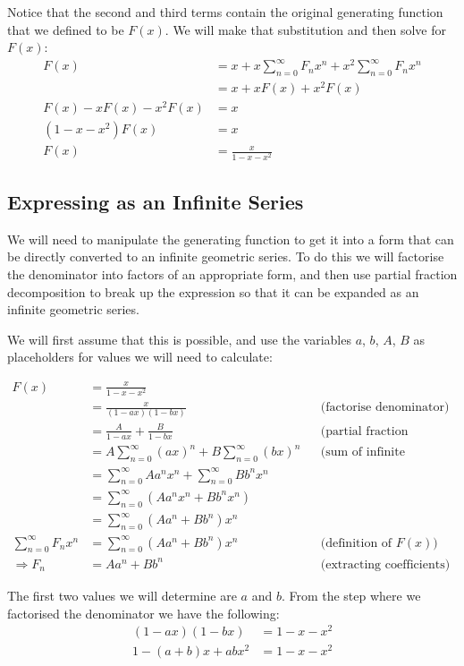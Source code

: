 \documentclass{article}
\begin{document}
Notice that the second and third terms contain the original generating function
that we defined to be \(F(x)\). We will make that substitution and then solve
for \(F(x)\):
\[\begin{aligned}
    F(x) &= x + x\sum_{n=0}^\infty F_nx^n + x^2\sum_{n=0}^\infty F_nx^n \\
    &= x + xF(x) + x^2F(x) \\
    F(x) - xF(x) - x^2F(x) &= x \\
    (1 - x - x^2)F(x) &= x \\
    F(x) &= \frac{x}{1-x-x^2}
\end{aligned}\]

\subsection*{Expressing as an Infinite Series}
We will need to manipulate the generating function to get it into a form that
can be directly converted to an infinite geometric series. To do this we will
factorise the denominator into factors of an appropriate form, and then use
partial fraction decomposition to break up the expression so that it can be
expanded as an infinite geometric series.

We will first assume that this is possible, and use the variables \(a\), \(b\),
\(A\), \(B\) as placeholders for values we will need to calculate:

\[\begin{aligned}
    F(x) &= \frac{x}{1-x-x^2} \\
    &= \frac{x}{(1-ax)(1-bx)} && \text{(factorise denominator)} \\
    &= \frac{A}{1-ax} + \frac{B}{1-bx}
        && \text{(partial fraction decomposition)} \\
    &= A \sum_{n=0}^\infty(ax)^n + B \sum_{n=0}^\infty(bx)^n
        && \text{(sum of infinite geometric series)} \\
    &= \sum_{n=0}^\infty Aa^nx^n + \sum_{n=0}^\infty Bb^nx^n \\
    &= \sum_{n=0}^\infty(Aa^nx^n + Bb^nx^n) \\
    &= \sum_{n=0}^\infty(Aa^n + Bb^n)x^n \\
    \sum_{n=0}^\infty F_nx^n &= \sum_{n=0}^\infty(Aa^n + Bb^n)x^n
        && \text{(definition of \(F(x)\))} \\
    \Rightarrow F_n &= Aa^n + Bb^n && \text{(extracting coefficients)}
\end{aligned}\]

The first two values we will determine are \(a\) and \(b\). From the step where
we factorised the denominator we have the following:
\[\begin{aligned}
    (1-ax)(1-bx) &= 1-x-x^2 \\
    1-(a+b)x + abx^2 &= 1-x-x^2
\end{aligned}\]
\end{document}
